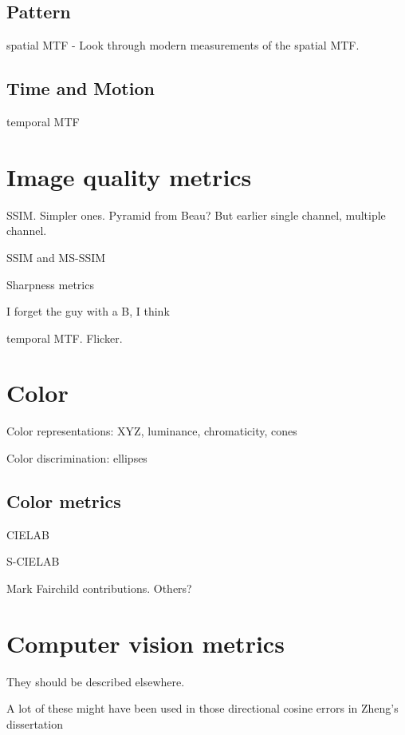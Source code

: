 \documentclass[
  letterpaper,
]{book}
\begin{document}
\subsection{Pattern}\label{pattern}

spatial MTF - Look through modern measurements of the spatial MTF.

\subsection{Time and Motion}\label{time-and-motion}

temporal MTF

\section{Image quality metrics}\label{sec-human-imagequality}

SSIM. Simpler ones. Pyramid from Beau? But earlier single channel,
multiple channel.

SSIM and MS-SSIM

Sharpness metrics

I forget the guy with a B, I think

temporal MTF. Flicker.

\section{Color}\label{color}

Color representations: XYZ, luminance, chromaticity, cones

Color discrimination: ellipses

\subsection{Color metrics}\label{color-metrics}

CIELAB

S-CIELAB

Mark Fairchild contributions. Others?

\section{Computer vision metrics}\label{computer-vision-metrics}

They should be described elsewhere.

A lot of these might have been used in those directional cosine errors
in Zheng's dissertation
\end{document}
